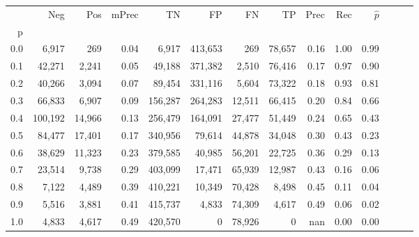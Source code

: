 \begin{tabular}{rrrrrrrrrrrrrr}
\toprule
{} &      Neg &     Pos & mPrec &       TN &       FP &      FN &      TP &  Prec &   Rec & $\hat{p}$ \\
p   &          &         &       &          &          &         &         &       &       &           \\
\midrule
0.0 &    6,917 &     269 &  0.04 &    6,917 &  413,653 &     269 &  78,657 &  0.16 &  1.00 &      0.99 \\
0.1 &   42,271 &   2,241 &  0.05 &   49,188 &  371,382 &   2,510 &  76,416 &  0.17 &  0.97 &      0.90 \\
0.2 &   40,266 &   3,094 &  0.07 &   89,454 &  331,116 &   5,604 &  73,322 &  0.18 &  0.93 &      0.81 \\
0.3 &   66,833 &   6,907 &  0.09 &  156,287 &  264,283 &  12,511 &  66,415 &  0.20 &  0.84 &      0.66 \\
0.4 &  100,192 &  14,966 &  0.13 &  256,479 &  164,091 &  27,477 &  51,449 &  0.24 &  0.65 &      0.43 \\
0.5 &   84,477 &  17,401 &  0.17 &  340,956 &   79,614 &  44,878 &  34,048 &  0.30 &  0.43 &      0.23 \\
0.6 &   38,629 &  11,323 &  0.23 &  379,585 &   40,985 &  56,201 &  22,725 &  0.36 &  0.29 &      0.13 \\
0.7 &   23,514 &   9,738 &  0.29 &  403,099 &   17,471 &  65,939 &  12,987 &  0.43 &  0.16 &      0.06 \\
0.8 &    7,122 &   4,489 &  0.39 &  410,221 &   10,349 &  70,428 &   8,498 &  0.45 &  0.11 &      0.04 \\
0.9 &    5,516 &   3,881 &  0.41 &  415,737 &    4,833 &  74,309 &   4,617 &  0.49 &  0.06 &      0.02 \\
1.0 &    4,833 &   4,617 &  0.49 &  420,570 &        0 &  78,926 &       0 &   nan &  0.00 &      0.00 \\
\bottomrule
\end{tabular}
